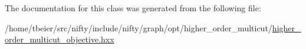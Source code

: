 The documentation for this class was generated from the following file\+:\begin{DoxyCompactItemize}
\item 
/home/tbeier/src/nifty/include/nifty/graph/opt/higher\+\_\+order\+\_\+multicut/\hyperlink{higher__order__multicut__objective_8hxx}{higher\+\_\+order\+\_\+multicut\+\_\+objective.\+hxx}\end{DoxyCompactItemize}
